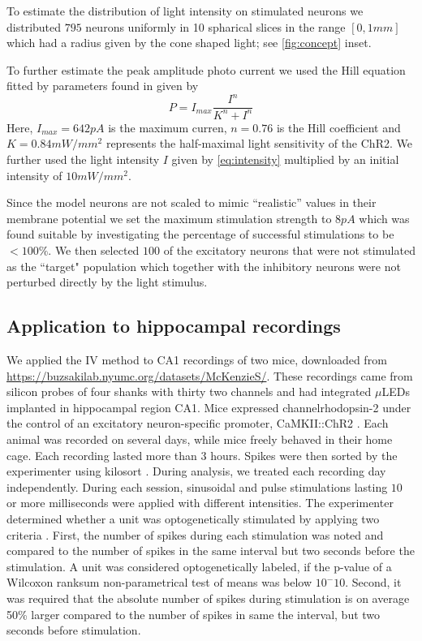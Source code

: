 \documentclass[11pt]{article}
\begin{document}
To estimate the distribution of light intensity on stimulated neurons we distributed $ 795 $ neurons uniformly in 10 spharical slices in the range $[0, 1 mm]$ which had a radius given by the cone shaped light; see \ref{fig:concept} inset.

To further estimate the peak amplitude photo current we used the Hill equation fitted by parameters found in \citet{wang2007high} given by 
\begin{equation}
    P = I_{max} \frac{I^n}{K^n + I^n}
\label{eq:hill}
\end{equation}
Here, $I_{max} = 642 pA$ is the maximum curren, $n=0.76$ is the Hill coefficient and $K = 0.84 mW/mm^2$ represents the half-maximal light sensitivity of the ChR2. 
We further used the light intensity $I$ given by \cref{eq:intensity} multiplied by an initial intensity of $10mW/mm^2$. 

Since the model neurons are not scaled to mimic ``realistic'' values in their membrane potential we set the maximum stimulation strength to $ 8 pA $ which was found suitable by investigating the percentage of successful stimulations to be $ < 100\% $. 
We then selected $ 100 $ of the excitatory neurons that were not stimulated as the ``target" population which together with the inhibitory neurons were not perturbed directly by the light stimulus.

\subsection{Application to hippocampal recordings}\label{sec:method:realdata}
We applied the IV method to CA1 recordings of two mice, downloaded from \url{https://buzsakilab.nyumc.org/datasets/McKenzieS/}.
These recordings came from silicon probes of four shanks with thirty two channels and had integrated $\mu$LEDs implanted in hippocampal region CA1.
Mice expressed channelrhodopsin-2 under the control of an excitatory neuron-specific promoter, CaMKII::ChR2 \citep{English2017}.
Each animal was recorded on several days, while mice freely behaved in their home cage.
Each recording lasted more than $3$ hours.
Spikes were then sorted by the experimenter using kilosort \citep{pachitariu2016kilosort}.
During analysis, we treated each recording day independently.
During each session, sinusoidal and pulse stimulations lasting $10$ or more milliseconds were applied with different intensities.
The experimenter determined whether a unit was optogenetically stimulated by applying two criteria \citep{English2017}.
First, the number of spikes during each stimulation was noted and compared to the number of spikes in the same interval but two seconds before the stimulation.
A unit was considered optogenetically labeled, if the p-value of a Wilcoxon ranksum non-parametrical test of means was below $10^-10$.
Second, it was required that the absolute number of spikes during stimulation is on average 50\% larger compared to the number of spikes in same the interval, but two seconds before stimulation.
\end{document}

